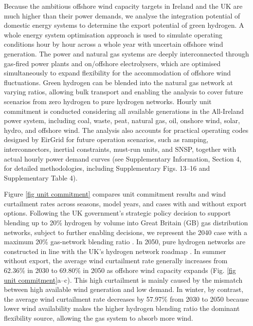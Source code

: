\documentclass[pdflatex,lineno,sn-mathphys,Numbered]{sn-jnl}%
\begin{document}
Because the ambitious offshore wind capacity targets in Ireland and the UK are much higher than their power demands, we analyse the integration potential of domestic energy systems to determine the export potential of green hydrogen. A whole energy system optimisation approach is used to simulate operating conditions hour by hour across a whole year with uncertain offshore wind generation. The power and natural gas systems are deeply interconnected through gas-fired power plants and on/offshore electrolysers, which are optimised simultaneously to expand flexibility for the accommodation of offshore wind fluctuations. Green hydrogen can be blended into the natural gas network at varying ratios, allowing bulk transport and enabling the analysis to cover future scenarios from zero hydrogen to pure hydrogen networks.
Hourly unit commitment is conducted considering all available generations in the All-Ireland power system, including coal, waste, peat, natural gas, oil, onshore wind, solar, hydro, and offshore wind. The analysis also accounts for practical operating codes designed by EirGrid \cite{OperationalPolicy} for future operation scenarios, such as ramping, interconnectors, inertial constraints, must-run units, and SNSP, together with actual hourly power demand curves (see Supplementary Information, Section 4, for detailed methodologies, including Supplementary Figs. 13--16 and Supplementary Table 4).

Figure \ref{fig unit commitment} compares unit commitment results and wind curtailment rates across seasons, model years, and cases with and without export options. Following the UK government's strategic policy decision to support blending up to 20\% hydrogen by volume into Great Britain (GB) gas distribution networks, subject to further enabling decisions, we represent the 2040 case with a maximum 20\% gas-network blending ratio \cite{HydrogenblendinginGB}. In 2050, pure hydrogen networks are constructed in line with the UK's hydrogen network roadmap \cite{BritainsHydrogenNetworkPlan}. In summer without export, the average wind curtailment rate generally increases from 62.36\% in 2030 to 69.80\% in 2050 as offshore wind capacity expands (Fig. \ref{fig unit commitment}a--c). This high curtailment is mainly caused by the mismatch between high available wind generation and low demand. In winter, by contrast, the average wind curtailment rate decreases by 57.97\% from 2030 to 2050 because lower wind availability makes the higher hydrogen blending ratio the dominant flexibility source, allowing the gas system to absorb more wind.
\end{document}
